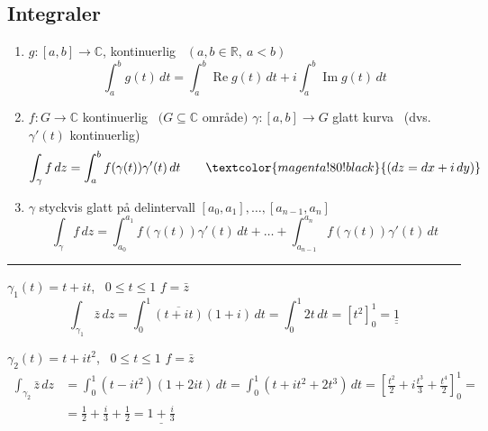 \subsection{Integraler}
\begin{enumerate}[label=\textcircled{\arabic*}]
  \item $g : [a, b] \to \mathbb{C}$, kontinuerlig \ $(a, b \in \mathbb{R},\ a < b)$
  \[ \int_a^b g(t)\,dt = \int_a^b \operatorname{Re} g(t)\,dt + i\int_a^b \operatorname{Im} g(t)\,dt \]
  \item $f : G \to \mathbb{C}$ kontinuerlig \ $(G \subseteq \mathbb{C}$ område$)$
  $\gamma : [a, b] \to G$ glatt kurva \ (dvs.\ $\gamma'(t)$ kontinuerlig)
  \[ \int_\gamma f\,dz = \int_a^b f(\gamma(t))\gamma'(t)\,dt \qquad \textcolor{magenta!80!black}{(dz = dx + i\,dy)} \]
  \item {}
  $\gamma$ styckvis glatt på delintervall $[a_0, a_1], \dots, [a_{n-1}, a_n]$
  \[ \int_\gamma f\,dz = \int_{a_0}^{a_1} f(\gamma(t))\gamma'(t)\,dt + \dots + \int_{a_{n-1}}^{a_n} f(\gamma(t))\gamma'(t)\,dt \]
\end{enumerate}

\noindent\rule{\linewidth}{0.4pt}

\begin{example}
$\gamma_1(t) = t + it$, \ $0 \le t \le 1$ \qquad $f = \bar{z}$
\[ \int_{\gamma_1} \bar{z}\,dz = \int_0^1 \overline{(t + it)}(1 + i)\,dt = \int_0^1 2t\,dt = \left[t^2\right]_0^1 = \underline{\underline{1}} \]

$\gamma_2(t) = t + it^2$, \ $0 \le t \le 1$ \qquad $f = \bar{z}$
\begin{align*}
  \int_{\gamma_2} \bar{z}\,dz &= \int_0^1 (t - it^2)(1 + 2it)\,dt = \int_0^1 (t + it^2 + 2t^3)\,dt = \left[\frac{t^2}{2} + i\frac{t^3}{3} + \frac{t^4}{2}\right]_0^1 = \\
  &= \frac{1}{2} + \frac{i}{3} + \frac{1}{2} = \underline{1 + \frac{i}{3}}
\end{align*}
\end{example}

